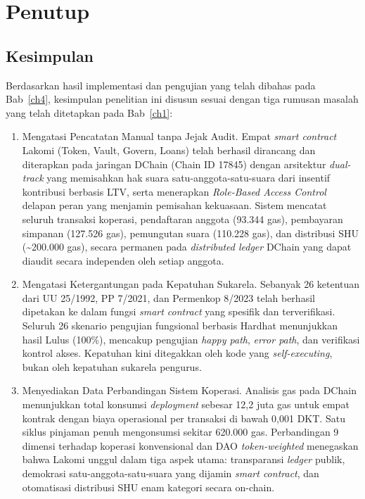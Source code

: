 \chapter{Penutup}
\label{ch5}

\section{Kesimpulan}

Berdasarkan hasil implementasi dan pengujian yang telah dibahas pada Bab~\ref{ch4}, kesimpulan penelitian ini disusun sesuai dengan tiga rumusan masalah yang telah ditetapkan pada Bab~\ref{ch1}:

\begin{enumerate}
	\item Mengatasi Pencatatan Manual tanpa Jejak Audit. Empat \textit{smart contract} Lakomi (Token, Vault, Govern, Loans) telah berhasil dirancang dan diterapkan pada jaringan DChain (Chain ID 17845) dengan arsitektur \textit{dual-track} yang memisahkan hak suara satu-anggota-satu-suara dari insentif kontribusi berbasis LTV, serta menerapkan \textit{Role-Based Access Control} delapan peran yang menjamin pemisahan kekuasaan. Sistem mencatat seluruh transaksi koperasi, pendaftaran anggota (93.344 gas), pembayaran simpanan (127.526 gas), pemungutan suara (110.228 gas), dan distribusi SHU (\textasciitilde200.000 gas), secara permanen pada \textit{distributed ledger} DChain yang dapat diaudit secara independen oleh setiap anggota.

	\item Mengatasi Ketergantungan pada Kepatuhan Sukarela. Sebanyak 26 ketentuan dari UU 25/1992, PP 7/2021, dan Permenkop 8/2023 telah berhasil dipetakan ke dalam fungsi \textit{smart contract} yang spesifik dan terverifikasi. Seluruh 26 skenario pengujian fungsional berbasis Hardhat menunjukkan hasil Lulus (100\%), mencakup pengujian \textit{happy path}, \textit{error path}, dan verifikasi kontrol akses. Kepatuhan kini ditegakkan oleh kode yang \textit{self-executing}, bukan oleh kepatuhan sukarela pengurus.

	\item Menyediakan Data Perbandingan Sistem Koperasi. Analisis gas pada DChain menunjukkan total konsumsi \textit{deployment} sebesar 12,2 juta gas untuk empat kontrak dengan biaya operasional per transaksi di bawah 0,001 DKT. Satu siklus pinjaman penuh mengonsumsi sekitar 620.000 gas. Perbandingan 9 dimensi terhadap koperasi konvensional dan DAO \textit{token-weighted} menegaskan bahwa Lakomi unggul dalam tiga aspek utama: transparansi \textit{ledger} publik, demokrasi satu-anggota-satu-suara yang dijamin \textit{smart contract}, dan otomatisasi distribusi SHU enam kategori secara on-chain.
\end{enumerate}

